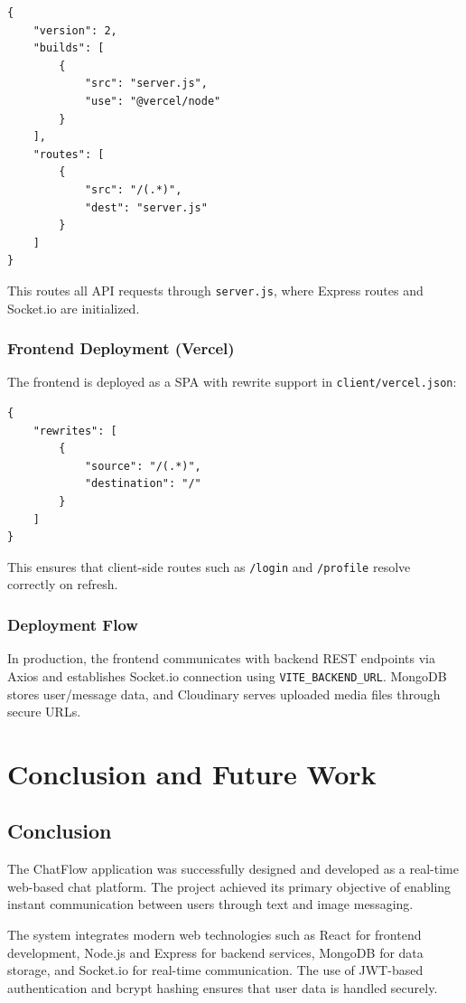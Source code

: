 \documentclass[12pt,a4paper]{report}
\begin{document}
\begin{verbatim}
{
    "version": 2,
    "builds": [
        {
            "src": "server.js",
            "use": "@vercel/node"
        }
    ],
    "routes": [
        {
            "src": "/(.*)",
            "dest": "server.js"
        }
    ]
}
\end{verbatim}

This routes all API requests through \texttt{server.js}, where Express routes and Socket.io are initialized.

\subsection{Frontend Deployment (Vercel)}
The frontend is deployed as a SPA with rewrite support in \texttt{client/vercel.json}:

\begin{verbatim}
{
    "rewrites": [
        {
            "source": "/(.*)",
            "destination": "/"
        }
    ]
}
\end{verbatim}

This ensures that client-side routes such as \texttt{/login} and \texttt{/profile} resolve correctly on refresh.

\subsection{Deployment Flow}
In production, the frontend communicates with backend REST endpoints via Axios and establishes Socket.io connection using \texttt{VITE\_BACKEND\_URL}. MongoDB stores user/message data, and Cloudinary serves uploaded media files through secure URLs.

\chapter{Conclusion and Future Work}

\section{Conclusion}

The ChatFlow application was successfully designed and developed as a real-time web-based chat platform. The project achieved its primary objective of enabling instant communication between users through text and image messaging.

The system integrates modern web technologies such as React for frontend development, Node.js and Express for backend services, MongoDB for data storage, and Socket.io for real-time communication. The use of JWT-based authentication and bcrypt hashing ensures that user data is handled securely.
\end{document}
